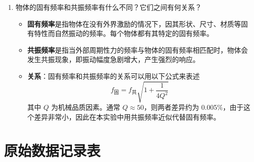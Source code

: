 \documentclass[zihao=5, UTF8]{article}
\theoremstyle{MyLineTheoremStyle} %
\theoremstyle{MyBlockTheoremStyle} %
\theoremstyle{MySubsubsectionStyle} %
\begin{document}
\begin{enumerate}
    \item 物体的固有频率和共振频率有什么不同？它们之间有何关系？
    \begin{itemize}
        \item \textbf{固有频率}是指物体在没有外界激励的情况下，因其形状、尺寸、材质等固有特性而自然振动的频率。每个物体都有其特定的固有频率。
        \item \textbf{共振频率}是指当外部周期性力的频率与物体的固有频率相匹配时，物体会发生共振现象，即振动幅度急剧增大，产生强烈的响应。
        \item \textbf{关系}：固有频率和共振频率的关系可以用以下公式来表述\[f_\text{固} = f_\text{共} \sqrt{1 + \frac{1}{4Q^2}}\]其中 \(Q\) 为机械品质因素。通常 \(Q \approx 50\)，则两者差异约为 0.005\%，由于这个差异非常小，因此在本实验中用共振频率近似代替固有频率。
    \end{itemize}
\end{enumerate}

\section{原始数据记录表}

\end{document}
